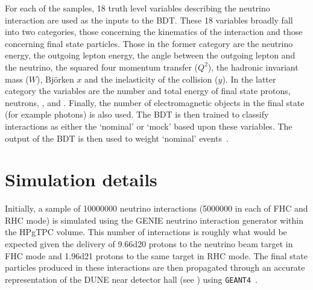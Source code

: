 For each of the samples, 18 truth level variables describing the neutrino interaction are used as the inputs to the BDT.
These 18 variables broadly fall into two categories, those concerning the kinematics of the interaction and those concerning final state particles. Those in the former category are the neutrino energy, the outgoing lepton energy, the angle between the outgoing lepton and the neutrino, the squared four momentum transfer ($Q^{2}$), the hadronic invariant mass ($W$), Bj\"orken $x$ and the inelasticity of the collision ($y$).
In the latter category the variables are the number and total energy of final state protons, neutrons, \piplus, \piminus and \pizero. 
Finally, the number of electromagnetic objects in the final state (for example photons) is also used.
The BDT is then trained to classify interactions as either the `nominal' or `mock' based upon these variables.
The output of the BDT is then used to weight `nominal' events~\cite{vilelaBDT}.

\section{Simulation details}
\label{sec:dune_ndrwt:simDetails}

Initially, a sample of \num{10000000} neutrino interactions (\num{5000000} in each of FHC and RHC mode) is simulated using the GENIE neutrino interaction generator within the HPgTPC volume.
This number of interactions is roughly what would be expected given the delivery of \num{9.66d20} protons to the neutrino beam target in FHC mode and \num{1.96d21} protons to the same target in RHC mode.
The final state particles produced in these interactions are then propagated through an accurate representation of the DUNE near detector hall (see ) using \texttt{GEANT4}~\cite{geant}. 
 
